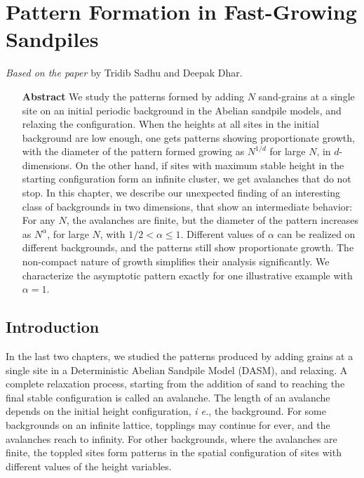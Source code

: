 \documentclass[11pt,a4paper]{book}
\begin{document}
\chapter{Pattern Formation in Fast-Growing Sandpiles}
\textit{Based on the paper \cite{myjsm}} by Tridib Sadhu and Deepak
Dhar.
\begin{itemize}
\item[\textbf{Abstract}]
We study the patterns formed by adding  $N$ sand-grains at a single
site on an initial periodic background in the
Abelian sandpile models, and relaxing the configuration. When the heights at
all sites in the initial background are low enough, one gets patterns
showing proportionate growth, with the diameter of the pattern formed
growing  as $N^{1/d}$ for large $N$, in $d$-dimensions. On the other
hand, if sites with
maximum stable height in the starting configuration form an infinite
cluster, we get  avalanches that do not stop. In this chapter, we
describe our unexpected finding of an interesting class of
backgrounds in two dimensions,  that  show  an  intermediate behavior:
For any $N$, the avalanches are finite, but  the diameter of the
pattern increases   as  $N^{\alpha}$, for large $N$, with $1/2 <
\alpha \leq 1$.  Different values of $\alpha$ can be realized  on
different backgrounds, and the patterns still show proportionate
growth. The non-compact nature of growth simplifies their
analysis significantly. We characterize the asymptotic pattern exactly for one
illustrative example with $\alpha=1$.
\end{itemize}
\section{Introduction}\label{sec:ch4.1}
In the last two chapters, we studied the patterns produced by adding
grains at a single site in a Deterministic Abelian Sandpile Model (DASM), and relaxing. A complete relaxation
process, starting from the addition of sand to reaching the final
stable configuration is called an avalanche. The length of an
avalanche depends on the initial height configuration,
\textit{i e.}, the background. For some
backgrounds on an infinite lattice, topplings may continue for ever,
and the avalanches reach to infinity. For other backgrounds, where the
avalanches are finite, the toppled
sites form patterns in the spatial configuration of sites with
different values of the height variables.
\end{document}
